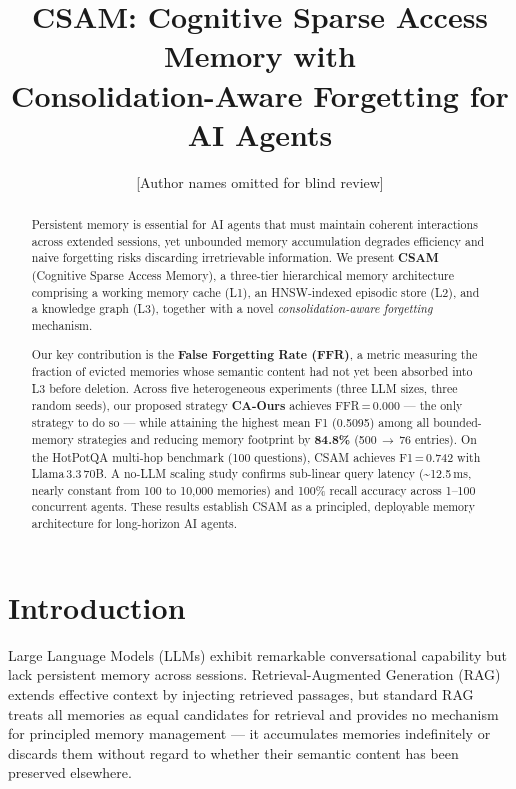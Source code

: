 \documentclass{article}
\title{CSAM: Cognitive Sparse Access Memory with\\
       Consolidation-Aware Forgetting for AI Agents}
\author{
  [Author names omitted for blind review]
}
\begin{document}
\maketitle

\begin{abstract}
Persistent memory is essential for AI agents that must maintain coherent
interactions across extended sessions, yet unbounded memory accumulation
degrades efficiency and naive forgetting risks discarding irretrievable
information.  We present \textbf{CSAM} (Cognitive Sparse Access Memory), a
three-tier hierarchical memory architecture comprising a working memory
cache (L1), an HNSW-indexed episodic store (L2), and a knowledge graph (L3),
together with a novel \emph{consolidation-aware forgetting} mechanism.

Our key contribution is the \textbf{False Forgetting Rate (FFR)}, a metric
measuring the fraction of evicted memories whose semantic content had not yet
been absorbed into L3 before deletion.  Across five heterogeneous experiments
(three LLM sizes, three random seeds), our proposed strategy
\textbf{CA-Ours} achieves FFR\,=\,0.000 — the only strategy to do so — while
attaining the highest mean F1 (0.5095) among all bounded-memory strategies and
reducing memory footprint by \textbf{84.8\%} (500\,$\rightarrow$\,76 entries).
On the HotPotQA multi-hop benchmark (100 questions), CSAM achieves
F1\,=\,0.742 with Llama\,3.3\,70B.  A no-LLM scaling study confirms
sub-linear query latency (\textasciitilde{}12.5\,ms, nearly constant from 100
to 10,000 memories) and 100\% recall accuracy across 1–100 concurrent agents.
These results establish CSAM as a principled, deployable memory architecture
for long-horizon AI agents.
\end{abstract}

\section{Introduction}
\label{sec:intro}

Large Language Models (LLMs) exhibit remarkable conversational capability but
lack persistent memory across sessions.  Retrieval-Augmented Generation (RAG)
extends effective context by injecting retrieved passages, but standard RAG
treats all memories as equal candidates for retrieval and provides no mechanism
for principled memory management — it accumulates memories indefinitely or
discards them without regard to whether their semantic content has been
preserved elsewhere.
\end{document}
